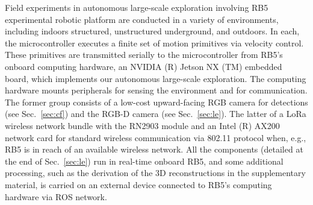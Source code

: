 \documentclass[lettersize,journal]{IEEEtran}
\theoremstyle{definition}
\begin{document}
Field experiments in autonomous large-scale exploration involving RB5 experimental robotic platform are conducted in a variety of environments, including indoors structured, unstructured underground, and outdoors. In each, the microcontroller executes a finite set of motion primitives via velocity control. These primitives are transmitted serially to the microcontroller from RB5's onboard computing hardware, an NVIDIA (R) Jetson NX (TM) embedded board, which implements our autonomous large-scale exploration. %
The computing hardware mounts peripherals for sensing the environment and for communication. The former group consists of a low-cost upward-facing RGB camera for detections (see Sec.~\ref{sec:cf}) and the RGB-D camera (see Sec.~\ref{sec:le}). The latter of a LoRa wireless network bundle with the RN2903 module and an Intel (R) AX200 network card for standard wireless communication via 802.11 protocol when, e.g., RB5 is in reach of an available wireless network.
%
All the components %
(detailed at the end of Sec.~\ref{sec:le}) run in real-time onboard RB5, and some additional processing, such as the derivation of the 3D reconstructions in the supplementary material, is carried on an external device connected to RB5's computing hardware via ROS network.
\end{document}
